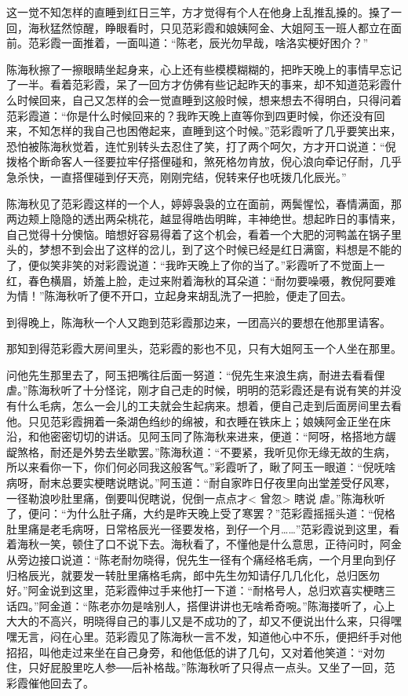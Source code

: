 \documentclass[12pt,UTF8]{ctexbook}
\begin{document}
{{{这一觉不知怎样的直睡到红日三竿，方才觉得有个人在他身上乱推乱搡的。搡了一回，海秋猛然惊醒，睁眼看时，只见范彩霞和娘姨阿金、大姐阿玉一班人都立在面前。范彩霞一面推着，一面叫道：“陈老，辰光勿早哉，啥洛实梗好困介？”

陈海秋擦了一擦眼睛坐起身来，心上还有些模模糊糊的，把昨天晚上的事情早忘记了一半。看着范彩霞，呆了一回方才仿佛有些记起昨天的事来，却不知道范彩霞什么时候回来，自己又怎样的会一觉直睡到这般时候，想来想去不得明白，只得问着范彩霞道：“你是什么时候回来的？我昨天晚上直等你到四更时候，你还没有回来，不知怎样的我自己也困倦起来，直睡到这个时候。”范彩霞听了几乎要笑出来，恐怕被陈海秋觉着，连忙别转头去忍住了笑，打了两个呵欠，方才开口说道：“倪拨格个断命客人一径要拉牢仔搭俚碰和，煞死格勿肯放，倪心浪向牵记仔耐，几乎急杀快，一直搭俚碰到仔天亮，刚刚完结，倪转来仔也呒拨几化辰光。”

陈海秋见了范彩霞这样的一个人，婷婷袅袅的立在面前，两鬓惺忪，春情满面，那两边颊上隐隐的透出两朵桃花，越显得皓齿明眸，丰神绝世。想起昨日的事情来，自己觉得十分懊恼。暗想好容易得着了这个机会，看着一个大肥的河鸭盖在锅子里头的，梦想不到会出了这样的岔儿，到了这个时候已经是红日满窗，料想是不能的了，便似笑非笑的对彩霞说道：“我昨天晚上了你的当了。”彩霞听了不觉面上一红，春色横眉，娇羞上脸，走过来附着海秋的耳朵道：“耐勿要噪嗫，教倪阿要难为情！”陈海秋听了便不开口，立起身来胡乱洗了一把脸，便走了回去。

到得晚上，陈海秋一个人又跑到范彩霞那边来，一团高兴的要想在他那里请客。

那知到得范彩霞大房间里头，范彩霞的影也不见，只有大姐阿玉一个人坐在那里。

问他先生那里去了，阿玉把嘴往后面一努道：“倪先生来浪生病，耐进去看看俚虐。”陈海秋听了十分怪诧，刚才自己走的时候，明明的范彩霞还是有说有笑的并没有什么毛病，怎么一会儿的工夫就会生起病来。想着，便自己走到后面房间里去看他。只见范彩霞拥着一条湖色绉纱的绵被，和衣睡在铁床上；娘姨阿金正坐在床沿，和他密密切切的讲话。见阿玉同了陈海秋来进来，便道：“阿呀，格搭地方龌龊煞格，耐还是外势去坐歇罢。”陈海秋道：“不要紧，我听见你无缘无故的生病，所以来看你一下，你们何必同我这般客气。”彩霞听了，瞅了阿玉一眼道：“倪呒啥病呀，耐末总要实梗瞎说瞎说。”阿玉道：“耐自家昨日仔夜里向出堂差受仔风寒，一径勒浪吵肚里痛，倒要叫倪瞎说，倪倒一点点才< 曾忽> 瞎说虐。”陈海秋听了，便问：“为什么肚子痛，大约是昨天晚上受了寒罢？”范彩霞摇摇头道：“倪格肚里痛是老毛病呀，日常格辰光一径要发格，到仔一个月……”范彩霞说到这里，看着海秋一笑，顿住了口不说下去。海秋看了，不懂他是什么意思，正待问时，阿金从旁边接口说道：“陈老耐勿晓得，倪先生一径有个痛经格毛病，一个月里向到仔归格辰光，就要发一转肚里痛格毛病，郎中先生勿知请仔几几化化，总归医勿好。”阿金说到这里，范彩霞伸过手来他打一下道：“耐格号人，总归欢喜实梗瞎三话四。”阿金道：“陈老亦勿是啥别人，搭俚讲讲也无啥希奇啘。”陈海搂听了，心上大大的不高兴，明晓得自己的事儿又是不成功的了，却又不便说出什么来，只得嘿嘿无言，闷在心里。范彩霞见了陈海秋一言不发，知道他心中不乐，便把纤手对他招招，叫他走过来坐在自己身旁，和他低低的讲了几句，又对着他笑道：“对勿住，只好屁股里吃人参──后补格哉。”陈海秋听了只得点一点头。又坐了一回，范彩霞催他回去了。

}}}
\end{document}
